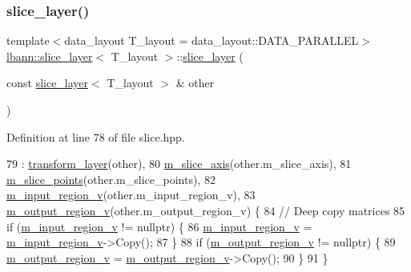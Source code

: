 \subsubsection{\texorpdfstring{slice\+\_\+layer()}{slice\_layer()}\hspace{0.1cm}{\footnotesize\ttfamily [2/2]}}
{\footnotesize\ttfamily template$<$data\+\_\+layout T\+\_\+layout = data\+\_\+layout\+::\+D\+A\+T\+A\+\_\+\+P\+A\+R\+A\+L\+L\+EL$>$ \\
\hyperlink{classlbann_1_1slice__layer}{lbann\+::slice\+\_\+layer}$<$ T\+\_\+layout $>$\+::\hyperlink{classlbann_1_1slice__layer}{slice\+\_\+layer} (\begin{DoxyParamCaption}\item[{const \hyperlink{classlbann_1_1slice__layer}{slice\+\_\+layer}$<$ T\+\_\+layout $>$ \&}]{other }\end{DoxyParamCaption})\hspace{0.3cm}{\ttfamily [inline]}}



Definition at line 78 of file slice.\+hpp.


\begin{DoxyCode}
79     : \hyperlink{classlbann_1_1transform__layer_a4b72501e0f4d0745c8b13c5331055e65}{transform\_layer}(other),
80       \hyperlink{classlbann_1_1slice__layer_a349dcd71f67d77d40247da24e4641ea2}{m\_slice\_axis}(other.m\_slice\_axis),
81       \hyperlink{classlbann_1_1slice__layer_af79dab13a70da2e81209e7ae15166e30}{m\_slice\_points}(other.m\_slice\_points),
82       \hyperlink{classlbann_1_1slice__layer_a3e64f86a9e999d3d72867c6009aa99ba}{m\_input\_region\_v}(other.m\_input\_region\_v),
83       \hyperlink{classlbann_1_1slice__layer_a9d72208fc8136641e91cb208c38f8b65}{m\_output\_region\_v}(other.m\_output\_region\_v) \{
84     \textcolor{comment}{// Deep copy matrices}
85     \textcolor{keywordflow}{if} (\hyperlink{classlbann_1_1slice__layer_a3e64f86a9e999d3d72867c6009aa99ba}{m\_input\_region\_v} != \textcolor{keyword}{nullptr}) \{
86       \hyperlink{classlbann_1_1slice__layer_a3e64f86a9e999d3d72867c6009aa99ba}{m\_input\_region\_v} = \hyperlink{classlbann_1_1slice__layer_a3e64f86a9e999d3d72867c6009aa99ba}{m\_input\_region\_v}->Copy();
87     \}
88     \textcolor{keywordflow}{if} (\hyperlink{classlbann_1_1slice__layer_a9d72208fc8136641e91cb208c38f8b65}{m\_output\_region\_v} != \textcolor{keyword}{nullptr}) \{
89       \hyperlink{classlbann_1_1slice__layer_a9d72208fc8136641e91cb208c38f8b65}{m\_output\_region\_v} = \hyperlink{classlbann_1_1slice__layer_a9d72208fc8136641e91cb208c38f8b65}{m\_output\_region\_v}->Copy();
90     \}
91   \}
\end{DoxyCode}
\mbox{\label{classlbann_1_1slice__layer_a12591fe9fbadca1a0345682c11788b03}} 
